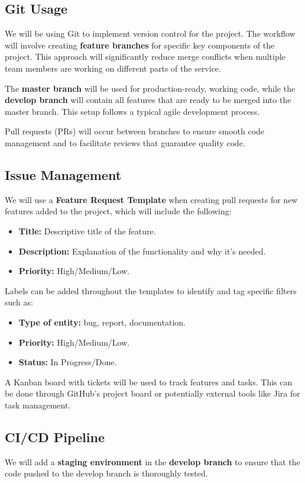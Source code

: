\documentclass{article}
\begin{document}
\subsection*{Git Usage}
We will be using Git to implement version control for the project. The workflow will involve creating \textbf{feature branches} for specific key components of the project. This approach will significantly reduce merge conflicts when multiple team members are working on different parts of the service.

The \textbf{master branch} will be used for production-ready, working code, while the \textbf{develop branch} will contain all features that are ready to be merged into the master branch. This setup follows a typical agile development process.

Pull requests (PRs) will occur between branches to ensure smooth code management and to facilitate reviews that guarantee quality code.

\subsection*{Issue Management}
We will use a \textbf{Feature Request Template} when creating pull requests for new features added to the project, which will include the following:
\begin{itemize}
    \item \textbf{Title:} Descriptive title of the feature.
    \item \textbf{Description:} Explanation of the functionality and why it's needed.
    \item \textbf{Priority:} High/Medium/Low.
\end{itemize}

Labels can be added throughout the templates to identify and tag specific filters such as:
\begin{itemize}
    \item \textbf{Type of entity:} bug, report, documentation.
    \item \textbf{Priority:} High/Medium/Low.
    \item \textbf{Status:} In Progress/Done.
\end{itemize}

A Kanban board with tickets will be used to track features and tasks. This can be done through GitHub’s project board or potentially external tools like Jira for task management.

\subsection*{CI/CD Pipeline}
We will add a \textbf{staging environment} in the \textbf{develop branch} to ensure that the code pushed to the develop branch is thoroughly tested.
\end{document}
